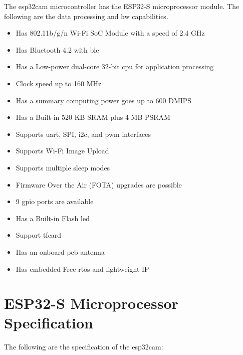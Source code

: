 The \ac{esp32cam} microcontroller has the ESP32-S microprocessor module. The following are the data processing and \ac{hw} capabilities.

\begin{itemize}
    \item Has 802.11b/g/n Wi-Fi SoC Module with a speed of 2.4 GHz
    \item Has Bluetooth 4.2 with \ac{ble}
    \item Has a Low-power dual-core 32-bit \ac{cpu} for application processing
    \item Clock speed up to 160 MHz
    \item Has a summary computing power goes up to 600 DMIPS
    \item Has a Built-in 520 KB SRAM plus 4 MB PSRAM
    \item Supports \ac{uart}, SPI, \ac{i2c}, and \ac{pwm} interfaces
    \item Supports Wi-Fi Image Upload
    \item Supports multiple sleep modes
    \item Firmware Over the Air (FOTA) upgrades are possible
    \item 9 \ac{gpio} ports are available
    \item Has a Built-in Flash \ac{led}
    \item Support \ac{tfcard}
    \item Has an onboard \ac{pcb} antenna
    \item Has embedded Free \ac{rtos} and lightweight IP
\end{itemize}


\section{ESP32-S Microprocessor Specification}

The following are the specification of the \ac{esp32cam}:

